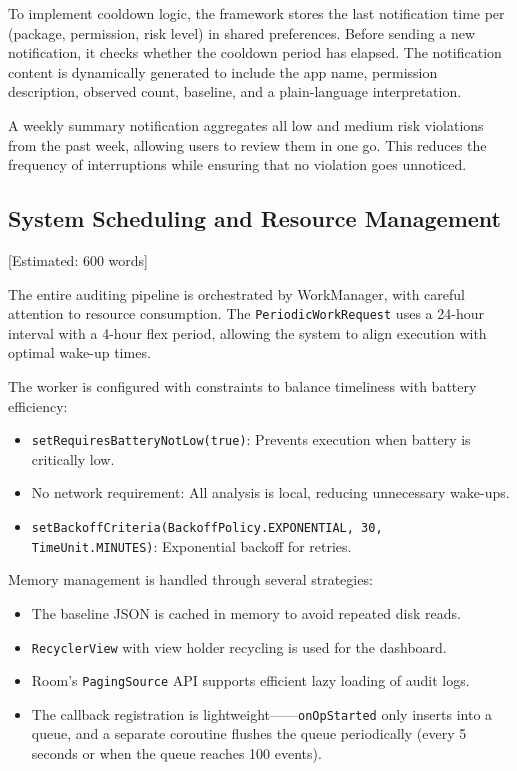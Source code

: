 To implement cooldown logic, the framework stores the last notification time per (package, permission, risk level) in shared preferences. Before sending a new notification, it checks whether the cooldown period has elapsed. The notification content is dynamically generated to include the app name, permission description, observed count, baseline, and a plain-language interpretation.

A weekly summary notification aggregates all low and medium risk violations from the past week, allowing users to review them in one go. This reduces the frequency of interruptions while ensuring that no violation goes unnoticed.

\subsection{System Scheduling and Resource Management} [Estimated: 600 words]

The entire auditing pipeline is orchestrated by WorkManager, with careful attention to resource consumption. The \texttt{PeriodicWorkRequest} uses a 24-hour interval with a 4-hour flex period, allowing the system to align execution with optimal wake-up times.

The worker is configured with constraints to balance timeliness with battery efficiency:
\begin{itemize}
\item \texttt{setRequiresBatteryNotLow(true)}: Prevents execution when battery is critically low.
\item No network requirement: All analysis is local, reducing unnecessary wake-ups.
\item \texttt{setBackoffCriteria(BackoffPolicy.EXPONENTIAL, 30, TimeUnit.MINUTES)}: Exponential backoff for retries.
\end{itemize}

Memory management is handled through several strategies:
\begin{itemize}
\item The baseline JSON is cached in memory to avoid repeated disk reads.
\item \texttt{RecyclerView} with view holder recycling is used for the dashboard.
\item Room's \texttt{PagingSource} API supports efficient lazy loading of audit logs.
\item The callback registration is lightweight——\texttt{onOpStarted} only inserts into a queue, and a separate coroutine flushes the queue periodically (every 5 seconds or when the queue reaches 100 events).
\end{itemize}


